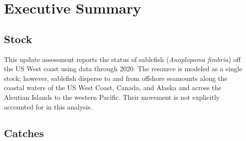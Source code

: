 \documentclass[11pt,
  english,
  a4paper,
]{article}
\begin{document}
\pagebreak
{}
\setcounter{page}{1}

\renewcommand{\thetable}{\roman{table}}
\renewcommand{\thefigure}{\roman{figure}}


\hypertarget{executive-summary}{%
\section*{Executive Summary}\label{executive-summary}}

\leavevmode\tagmcend\tagstructend


\hypertarget{stock}{%
\subsection*{Stock}\label{stock}}

\leavevmode\tagmcend\tagstructend


This update assessment reports the status of sablefish (\emph{Anoplopoma fimbria}) off the US West coast using data through 2020. The resource is modeled as a single stock; however, sablefish disperse to and from offshore seamounts along the coastal waters of the US West Coast, Canada, and Alaska and across the Aleutian Islands to the western Pacific. Their movement is not explicitly accounted for in this analysis.

\leavevmode\tagmcend\tagstructend\par


\hypertarget{catches}{%
\subsection*{Catches}\label{catches}}

\leavevmode\tagmcend\tagstructend

\end{document}
